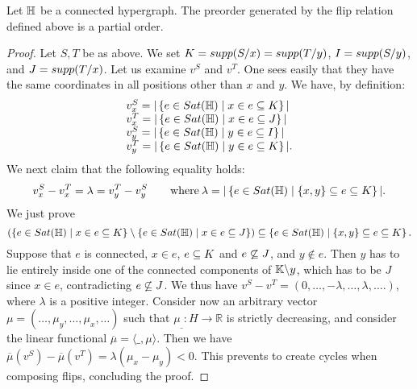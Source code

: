 \begin{proposition} \label{flip-partial-order}

Let ${\mathbb H}$ be a connected hypergraph. The preorder generated by the flip relation defined above is a partial order.
\end{proposition}
\begin{proof}
Let $S,T$ be as above. We set $K={supp}(S/x)={supp}(T/y)$, $I={supp}(S/y)$, and $J={supp}(T/x)$.
Let us examine $v^S$ and $v^T$. One sees easily that they have the same coordinates in all positions other than $x$ and  $y$. We have, by definition:
$$\begin{array}{l}
v^S_x  = |\left\{e\in{Sat}({\mathbb H}) \mid x\in e\subseteq K\right\}|\\
v^T_x  = |\left\{e\in{Sat}({\mathbb H}) \mid x\in e\subseteq J\right\}|\\ 
v^S_y  = |\left\{e\in{Sat}({\mathbb H}) \mid y\in e\subseteq I\right\}|\\
v^T_y  = |\left\{e\in{Sat}({\mathbb H}) \mid y\in e\subseteq K\right\}|.
\end{array}$$
We next claim that the following equality holds:
$$v^S_x  - v^T_x  = \lambda = 
v^T_y - v^S_y \quad\quad\textrm{where}\: \lambda= |\left\{e\in{Sat}({\mathbb H}) \mid \left\{x,y\right\}\subseteq e\subseteq K\right\}|.$$
We just prove 
$$(\left\{e\in{Sat}({\mathbb H}) \mid x\in e\subseteq K\right\}\setminus\left\{e\in{Sat}({\mathbb H}) \mid x\in e\subseteq J\right\})\subseteq\left\{e\in{Sat}({\mathbb H}) \mid \left\{x,y\right\}\subseteq e\subseteq K\right\}.$$
Suppose that $e$ is connected, $x\in e$, $e\subseteq K$ and $e\not\subseteq J$, and $y\not\in e$. Then $y$ has to lie entirely inside one of the connected components of ${\mathbb K}\backslash y$, which has to be $J$ since $x\in e$, contradicting $e\not\subseteq J$.
We thus have 
$v^S - v^T = (0,…,-\lambda,…,\lambda,….)$, where $\lambda$ is a positive integer.
Consider now an arbitrary vector $\mu=(\ldots,\mu_y,\ldots,\mu_x,\ldots)$ such that $\mu_{\_}:H\rightarrow\mathbb{R}$ is strictly decreasing, and consider the linear functional $\overline{\mu}=\langle\_,\mu\rangle$. 
Then we have 
$\overline{\mu}(v^S)- \overline{\mu}(v^T)=\lambda(\mu_x-\mu_y)<0$. This prevents to create cycles when composing flips, concluding the proof.
\end{proof}


